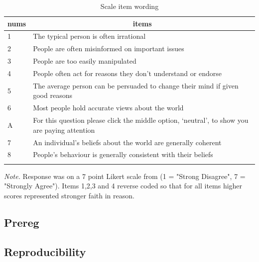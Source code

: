 \documentclass[
  ,jou,floatsintext]{apa6}
\begin{document}
\begin{table}[tbp]

\begin{center}
\begin{threeparttable}

\caption{\label{tab:items}Scale item wording}

\begin{tabular}{ll}
\toprule
nums & \multicolumn{1}{c}{items}\\
\midrule
1 & The typical person is often irrational\\
2 & People are often misinformed on important issues\\
3 & People are too easily manipulated\\
4 & People often act for reasons they don’t understand or endorse\\
5 & The average person can be persuaded to change their mind if given good reasons\\
6 & Most people hold accurate views about the world\\
A & For this question please click the middle option, ‘neutral’, to show you are paying attention\\
7 & An individual's beliefs about the world are generally coherent\\
8 & People's behaviour is generally consistent with their beliefs\\
\bottomrule
\addlinespace
\end{tabular}

\begin{tablenotes}[para]
\normalsize{\textit{Note.} Response was on a 7 point Likert scale from (1 = "Strong Disagree", 7 = "Strongly Agree"). Items 1,2,3 and 4 reverse coded so that for all items higher scores represented stronger faith in reason.}
\end{tablenotes}

\end{threeparttable}
\end{center}

\end{table}

\hypertarget{prereg}{%
\subsection{Prereg}\label{prereg}}

\hypertarget{reproducibility}{%
\subsection{Reproducibility}\label{reproducibility}}
\end{document}
